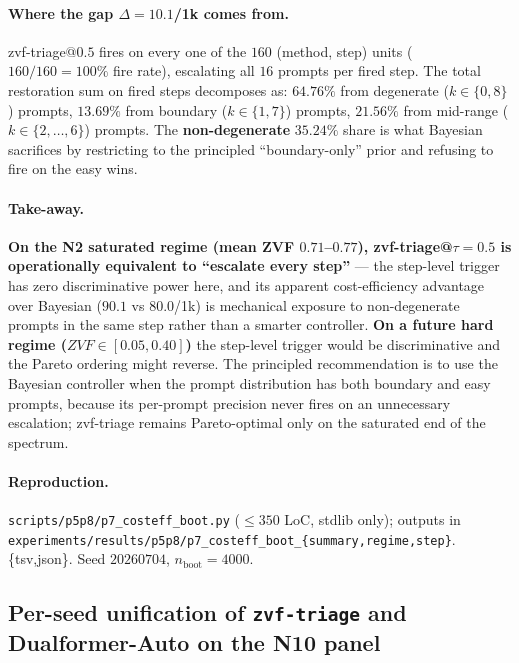 \documentclass{article}
\begin{document}
\paragraph{Where the gap $\Delta{=}10.1$/1k comes from.}
zvf-triage@$0.5$ fires on every one of the $160$ (method, step)
units ($160/160 = 100\%$ fire rate), escalating all $16$ prompts
per fired step. The total restoration sum on fired steps decomposes
as: $64.76\%$ from degenerate ($k{\in}\{0,8\}$) prompts,
$13.69\%$ from boundary ($k{\in}\{1,7\}$) prompts, $21.56\%$
from mid-range ($k{\in}\{2,\ldots,6\}$) prompts. The
\textbf{non-degenerate} $35.24\%$ share is what Bayesian
sacrifices by restricting to the principled ``boundary-only''
prior and refusing to fire on the easy wins.

\paragraph{Take-away.}
\textbf{On the N2 saturated regime (mean ZVF $0.71$--$0.77$),
zvf-triage@$\tau{=}0.5$ is operationally equivalent to
``escalate every step''} — the step-level trigger has zero
discriminative power here, and its apparent cost-efficiency
advantage over Bayesian ($90.1$ vs $80.0$/1k) is mechanical
exposure to non-degenerate prompts in the same step rather than
a smarter controller. \textbf{On a future hard regime
($ZVF \in [0.05, 0.40]$)} the step-level trigger would be
discriminative and the Pareto ordering might reverse. The
principled recommendation is to use the Bayesian controller
when the prompt distribution has both boundary and easy prompts,
because its per-prompt precision never fires on an unnecessary
escalation; zvf-triage remains Pareto-optimal only on the
saturated end of the spectrum.

\paragraph{Reproduction.}
\texttt{scripts/p5p8/p7\_costeff\_boot.py} ($\leq 350$ LoC,
stdlib only); outputs in
\texttt{experiments/results/p5p8/p7\_costeff\_boot\_\{summary,regime,step\}}.\{tsv,json\}.
Seed $20260704$, $n_{\mathrm{boot}}{=}4000$.

\subsection{Per-seed unification of \texttt{zvf-triage} and Dualformer-Auto
on the N10 panel}
\label{sec:p7-controller-n10unif}
\end{document}
